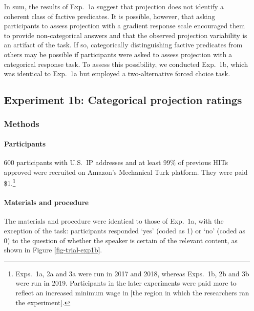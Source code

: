 \documentclass[11pt,fleqn]{article}
\newcommand{\6}{\mbox{$[\hspace*{-.6mm}[$}}
\newcommand{\9}{\mbox{$]\hspace*{-.6mm}]$}}
\begin{document}
In sum, the results of Exp.~1a suggest that projection does not identify a coherent class of factive predicates. It is possible, however, that asking participants to assess projection with a gradient response scale encouraged them to provide non-categorical answers and that the observed projection variability is an artifact of the task. If so, categorically distinguishing factive predicates from others may be possible if participants were asked to assess projection with a categorical response task. To assess this possibility, we conducted Exp.~1b, which was identical to Exp.~1a but employed a two-alternative forced choice task.


\subsection{Experiment 1b: Categorical projection ratings}\label{s-exp1b}

\subsubsection{Methods}

\paragraph{Participants} 600 participants with U.S.\ IP addresses and at least 99\% of previous HITs approved were recruited on Amazon's Mechanical Turk platform. They were paid \$1.\footnote{Exps.~1a, 2a and 3a were run in 2017 and 2018, whereas  Exps.~1b, 2b and 3b were run in 2019. Participants in the later experiments were paid more to reflect an increased minimum wage in $[$the region in which the researchers ran the experiment$]$.}


\paragraph{Materials and procedure} The materials and procedure were identical to those of Exp.~1a, with the exception of the task: participants responded `yes' (coded as 1) or `no' (coded as 0) to the question of whether the speaker is certain of the relevant content, as shown in Figure \ref{fig-trial-exp1b}.
\end{document}
